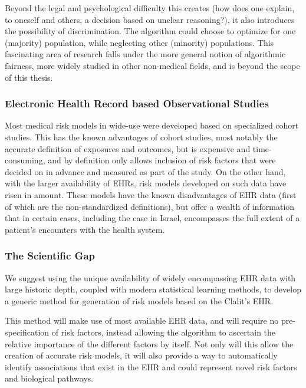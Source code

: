 \documentclass[a4paper,12pt]{article}
\begin{document}
			Beyond the legal and psychological difficulty this creates (how does one explain, to oneself and others, a decision based on unclear reasoning?), it also introduces the possibility of discrimination. The algorithm could choose to optimize for one (majority) population, while neglecting other (minority) populations\cite{Hebert-Johnson2017}. This fascinating area of research falls under the more general notion of algorithmic fairness, more widely studied in other non-medical fields\cite{Corbett-Davies2017}, and is beyond the scope of this thesis.
			
			\subsubsection{Electronic Health Record based Observational Studies}
		
			Most medical risk models in wide-use were developed based on specialized cohort studies\cite{Goldstein2016}. This has the known advantages of cohort studies, most notably the accurate definition of exposures and outcomes, but is expensive and time-consuming, and by definition only allows inclusion of risk factors that were decided on in advance and measured as part of the study. On the other hand, with the larger availability of EHRs, risk models developed on such data have risen in amount. These models have the known disadvantages of EHR data (first of which are the non-standardized definitions), but offer a wealth of information that in certain cases, including the case in Israel\cite{Lovis2015}, encompasses the full extent of a patient's encounters with the health system\cite{Goldstein2017}.
			
			\subsubsection{The Scientific Gap}
			
			We suggest using the unique availability of widely encompassing EHR data with large historic depth, coupled with modern statistical learning methods, to develop a generic method for generation of risk models based on the Clalit's EHR.
			
			This method will make use of most available EHR data, and will require no pre-specification of risk factors, instead allowing the algorithm to ascertain the relative importance of the different factors by itself. Not only will this allow the creation of accurate risk models, it will also provide a way to automatically identify associations that exist in the EHR and could represent novel risk factors and biological pathways.
			
\end{document}

